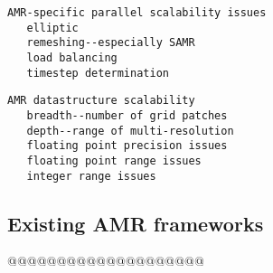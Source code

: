 \documentclass{article}
\begin{document}
\begin{verbatim}
AMR-specific parallel scalability issues
   elliptic
   remeshing--especially SAMR
   load balancing
   timestep determination
\end{verbatim}

\begin{verbatim}
AMR datastructure scalability
   breadth--number of grid patches
   depth--range of multi-resolution
   floating point precision issues
   floating point range issues
   integer range issues
\end{verbatim}

\subsection{Existing AMR frameworks} \label{ss:review}

@@@@@@@@@@@@@@@@@@@@
\end{document}
